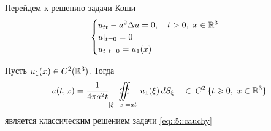 \documentclass[../main.tex]{subfiles}
\begin{document}

Перейдем к решению задачи Коши
\begin{equation}
\begin{cases}
  u_{tt} - a^2\Delta u = 0,   \quad t>0,\   x \in \mathbb{R}^3 \\
   u |_{t=0} = 0   \\
  u_t|_{t=0} = u_1(x)
\end{cases}
\label{eq::5::cauchy}
\end{equation}

\begin{theorem}
Пусть $u_1(x) \in C^2(\mathbb{R}^3)$. Тогда 
\[
u(t,x) = \frac{1}{4\pi a^2t}
\oiint\limits_{|\xi-x|=at}  u_1(\xi)\,  dS_{\xi}   \quad
\in\: C^2\,   \{t\geqslant 0,\   x \in \mathbb{R}^3 \}
\]
является классическим решением задачи \eqref{eq::5::cauchy}
\end{theorem}
\end{document}

